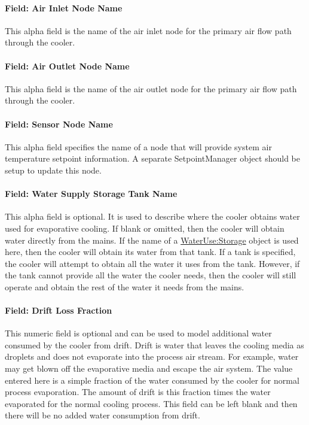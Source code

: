 \paragraph{Field: Air Inlet Node Name}\label{field-air-inlet-node-name-1-001}

This alpha field is the name of the air inlet node for the primary air flow path through the cooler.

\paragraph{Field: Air Outlet Node Name}\label{field-air-outlet-node-name-1-000}

This alpha field is the name of the air outlet node for the primary air flow path through the cooler.

\paragraph{Field: Sensor Node Name}\label{field-sensor-node-name-001}

This alpha field specifies the name of a node that will provide system air temperature setpoint information. A separate SetpointManager object should be setup to update this node.

\paragraph{Field: Water Supply Storage Tank Name}\label{field-water-supply-storage-tank-name-1}

This alpha field is optional. It is used to describe where the cooler obtains water used for evaporative cooling. If blank or omitted, then the cooler will obtain water directly from the mains. If the name of a \hyperref[waterusestorage]{WaterUse:Storage} object is used here, then the cooler will obtain its water from that tank. If a tank is specified, the cooler will attempt to obtain all the water it uses from the tank. However, if the tank cannot provide all the water the cooler needs, then the cooler will still operate and obtain the rest of the water it needs from the mains.

\paragraph{Field: Drift Loss Fraction}\label{field-drift-loss-fraction}

This numeric field is optional and can be used to model additional water consumed by the cooler from drift. Drift is water that leaves the cooling media as droplets and does not evaporate into the process air stream. For example, water may get blown off the evaporative media and escape the air system. The value entered here is a simple fraction of the water consumed by the cooler for normal process evaporation. The amount of drift is this fraction times the water evaporated for the normal cooling process. This field can be left blank and then there will be no added water consumption from drift.


